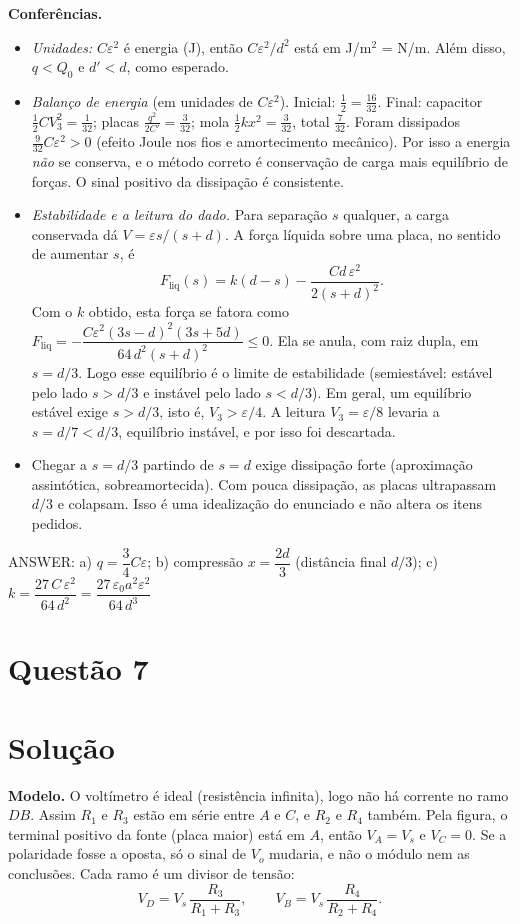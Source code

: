 \documentclass{article}%
\begin{document}
\textbf{Conferências.}
\begin{itemize}
\item \emph{Unidades:} $C\varepsilon^2$ é energia (J), então $C\varepsilon^2/d^2$ está em J/m$^2$ = N/m. Além disso, $q<Q_0$ e $d'<d$, como esperado.
\item \emph{Balanço de energia} (em unidades de $C\varepsilon^2$). Inicial: $\tfrac12=\tfrac{16}{32}$. Final: capacitor $\tfrac12CV_3^2=\tfrac1{32}$; placas $\tfrac{q^2}{2C'}=\tfrac{3}{32}$; mola $\tfrac12kx^2=\tfrac{3}{32}$, total $\tfrac{7}{32}$. Foram dissipados $\tfrac{9}{32}C\varepsilon^2>0$ (efeito Joule nos fios e amortecimento mecânico). Por isso a energia \emph{não} se conserva, e o método correto é conservação de carga mais equilíbrio de forças. O sinal positivo da dissipação é consistente.
\item \emph{Estabilidade e a leitura do dado.} Para separação $s$ qualquer, a carga conservada dá $V=\varepsilon s/(s+d)$. A força líquida sobre uma placa, no sentido de aumentar $s$, é
\[
F_{\text{liq}}(s)=k(d-s)-\frac{Cd\,\varepsilon^2}{2(s+d)^2}.
\]
Com o $k$ obtido, esta força se fatora como $F_{\text{liq}}=-\dfrac{C\varepsilon^2(3s-d)^2(3s+5d)}{64\,d^2(s+d)^2}\le0$. Ela se anula, com raiz dupla, em $s=d/3$. Logo esse equilíbrio é o limite de estabilidade (semiestável: estável pelo lado $s>d/3$ e instável pelo lado $s<d/3$). Em geral, um equilíbrio estável exige $s>d/3$, isto é, $V_3>\varepsilon/4$. A leitura $V_3=\varepsilon/8$ levaria a $s=d/7<d/3$, equilíbrio instável, e por isso foi descartada.
\item Chegar a $s=d/3$ partindo de $s=d$ exige dissipação forte (aproximação assintótica, sobreamortecida). Com pouca dissipação, as placas ultrapassam $d/3$ e colapsam. Isso é uma idealização do enunciado e não altera os itens pedidos.
\end{itemize}

ANSWER: a) $q=\dfrac{3}{4}C\varepsilon$; b) compressão $x=\dfrac{2d}{3}$ (distância final $d/3$); c) $k=\dfrac{27\,C\,\varepsilon^{2}}{64\,d^{2}}=\dfrac{27\,\varepsilon_0 a^2\varepsilon^2}{64\,d^3}$%
\newpage%
\section*{Questão 7}

\section*{Solução}

\textbf{Modelo.} O voltímetro é ideal (resistência infinita), logo não há corrente no ramo $DB$. Assim $R_1$ e $R_3$ estão em série entre $A$ e $C$, e $R_2$ e $R_4$ também. Pela figura, o terminal positivo da fonte (placa maior) está em $A$, então $V_A=V_s$ e $V_C=0$. Se a polaridade fosse a oposta, só o sinal de $V_o$ mudaria, e não o módulo nem as conclusões. Cada ramo é um divisor de tensão:
\[
V_D=V_s\,\frac{R_3}{R_1+R_3},\qquad V_B=V_s\,\frac{R_4}{R_2+R_4}.
\]
\end{document}
